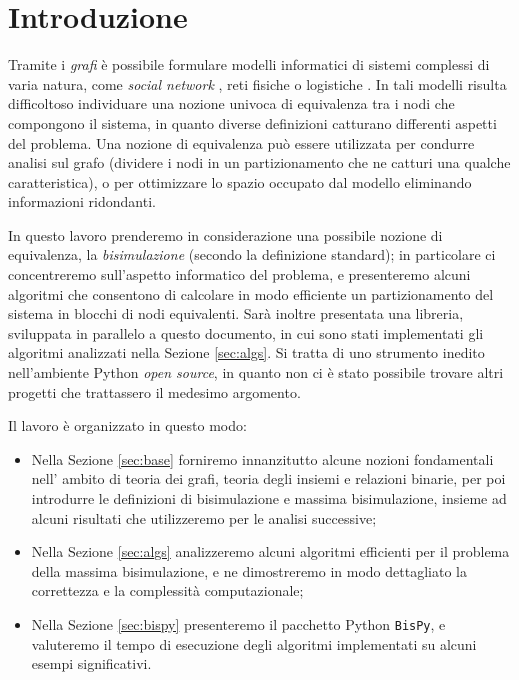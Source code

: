 \section*{Introduzione}

Tramite i \emph{grafi} è possibile formulare modelli informatici di sistemi complessi di varia natura, come \emph{social network} \cite{twitter}, reti fisiche \cite{electric} o logistiche \cite{supply}. In tali modelli risulta difficoltoso individuare una nozione univoca di equivalenza tra i nodi che compongono il sistema, in quanto diverse definizioni catturano differenti aspetti del problema. Una nozione di equivalenza può essere utilizzata per condurre analisi sul grafo (dividere i nodi in un partizionamento che ne catturi una qualche caratteristica), o per ottimizzare lo spazio occupato dal modello eliminando informazioni ridondanti.

In questo lavoro prenderemo in considerazione una possibile nozione di equivalenza, la \emph{bisimulazione} (secondo la definizione standard); in particolare ci concentreremo sull'aspetto informatico del problema, e presenteremo alcuni algoritmi che consentono di calcolare in modo efficiente un partizionamento del sistema in blocchi di nodi equivalenti. Sarà inoltre presentata una libreria, sviluppata in parallelo a questo documento, in cui sono stati implementati gli algoritmi analizzati nella Sezione \ref{sec:algs}. Si tratta di uno strumento inedito nell'ambiente Python \emph{open source}, in quanto non ci è stato possibile trovare altri progetti che trattassero il medesimo argomento.

Il lavoro è organizzato in questo modo:
\begin{itemize}
    \item Nella Sezione \ref{sec:base} forniremo innanzitutto alcune nozioni fondamentali nell' ambito di teoria dei grafi, teoria degli insiemi e relazioni binarie, per poi introdurre le definizioni di bisimulazione e massima bisimulazione, insieme ad alcuni risultati che utilizzeremo per le analisi successive;
    \item Nella Sezione \ref{sec:algs} analizzeremo alcuni algoritmi efficienti per il problema della massima bisimulazione, e ne dimostreremo in modo dettagliato la correttezza e la complessità computazionale;
    \item Nella Sezione \ref{sec:bispy} presenteremo il pacchetto Python \texttt{BisPy}, e valuteremo il tempo di esecuzione degli algoritmi implementati su alcuni esempi significativi.
\end{itemize}
